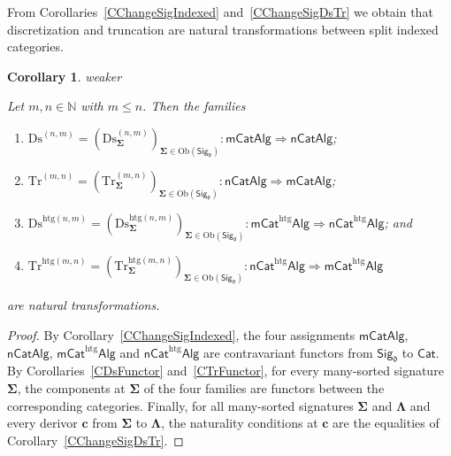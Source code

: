 \documentclass[a4paper, reqno]{amsbook}
\makeatletter
\newcommand{\sig}[1]{\mathbf{#1}}             %
\newcommand{\htg}{\mathrm{htg}}                %
\newcommand{\Ds}{\mathrm{Ds}}
\newcommand{\Tr}{\mathrm{Tr}}
\theoremstyle{plain}
\newtheorem{corollary}[theorem]{Corollary}
\theoremstyle{definition}
\newcommand*{\CA@leanpending}{}
\newcommand*{\CA@leanrelation}{}
\newcommand*{\lean}[2]{%
  \ifcsname\string\color@lean@#1\endcsname\else
    \PackageError{main}{Unknown relation `#1' in \string\lean}{Use equivalent, weaker or stronger.}%
  \fi
  \gdef\CA@leanrelation{#1}%
  \gdef\CA@leanpending{#2}}
\makeatother
\begin{document}
From Corollaries~\ref{CChangeSigIndexed} and~\ref{CChangeSigDsTr} we obtain that discretization and truncation are natural transformations between split indexed categories.

\begin{corollary}\label{CChangeSigDsTrNat}\lean{weaker}{ChangeOfSignature.homogeneousDiscretizationNaturality,ChangeOfSignature.homogeneousTruncationNaturality,ChangeOfSignature.heterogeneousDiscretizationNaturality,ChangeOfSignature.heterogeneousTruncationNaturality}
Let $m,n\in\mathbb{N}$ with $m\leq n$.
Then the families
\begin{enumerate}
	\item 
	$\Ds^{(n,m)}=(\Ds^{(n,m)}_{\sig{\Sigma}})_{\sig{\Sigma} \in \mathrm{Ob}(\mathsf{Sig}_{\mathfrak{d}})}\colon\mathsf{mCatAlg}\Longrightarrow\mathsf{nCatAlg}$;
	
	\item
	$\Tr^{(m,n)}=(\Tr^{(m,n)}_{\sig{\Sigma}})_{\sig{\Sigma} \in \mathrm{Ob}(\mathsf{Sig}_{\mathfrak{d}})}\colon\mathsf{nCatAlg}\Longrightarrow\mathsf{mCatAlg}$;
	
	\item 
	$\Ds^{\htg(n,m)}=(\Ds^{\htg(n,m)}_{\sig{\Sigma}})_{\sig{\Sigma} \in \mathrm{Ob}(\mathsf{Sig}_{\mathfrak{d}})}\colon\mathsf{mCat}^{\htg}\mathsf{Alg}\Longrightarrow\mathsf{nCat}^{\htg}\mathsf{Alg}$; and
	
	\item 
	$\Tr^{\htg(m,n)}=(\Tr^{\htg(m,n)}_{\sig{\Sigma}})_{\sig{\Sigma} \in \mathrm{Ob}(\mathsf{Sig}_{\mathfrak{d}})}\colon\mathsf{nCat}^{\htg}\mathsf{Alg}\Longrightarrow\mathsf{mCat}^{\htg}\mathsf{Alg}$
\end{enumerate}
are natural transformations.
\end{corollary}
\begin{proof}
By Corollary~\ref{CChangeSigIndexed}, the four assignments $\mathsf{mCatAlg}$, $\mathsf{nCatAlg}$, $\mathsf{mCat}^{\htg}\mathsf{Alg}$ and $\mathsf{nCat}^{\htg}\mathsf{Alg}$ are contravariant functors from $\mathsf{Sig}_{\mathfrak{d}}$ to $\mathsf{Cat}$.
By Corollaries~\ref{CDsFunctor} and~\ref{CTrFunctor}, for every many-sorted signature $\sig{\Sigma}$, the components at $\sig{\Sigma}$ of the four families are functors between the corresponding categories.
Finally, for all many-sorted signatures $\sig{\Sigma}$ and $\sig{\Lambda}$ and every derivor $\mathbf{c}$ from $\sig{\Sigma}$ to $\sig{\Lambda}$, the naturality conditions at $\mathbf{c}$ are the equalities of Corollary~\ref{CChangeSigDsTr}.
\end{proof}
\end{document}
